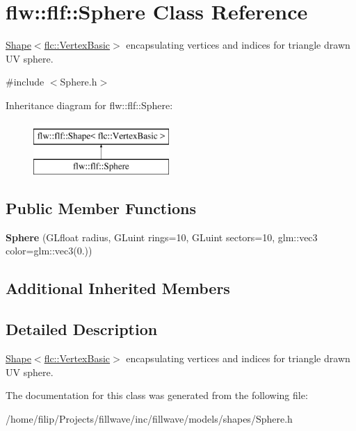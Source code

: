 \hypertarget{classflw_1_1flf_1_1Sphere}{}\section{flw\+:\+:flf\+:\+:Sphere Class Reference}
\label{classflw_1_1flf_1_1Sphere}


\hyperlink{classflw_1_1flf_1_1Shape}{Shape$<$flc\+::\+Vertex\+Basic$>$} encapsulating vertices and indices for triangle drawn UV sphere.  




{\ttfamily \#include $<$Sphere.\+h$>$}

Inheritance diagram for flw\+:\+:flf\+:\+:Sphere\+:\begin{figure}[H]
\begin{center}
\leavevmode
\includegraphics[height=2.000000cm]{classflw_1_1flf_1_1Sphere}
\end{center}
\end{figure}
\subsection*{Public Member Functions}
\begin{DoxyCompactItemize}
\item 
{\bfseries Sphere} (G\+Lfloat radius, G\+Luint rings=10, G\+Luint sectors=10, glm\+::vec3 color=glm\+::vec3(0.))\hypertarget{classflw_1_1flf_1_1Sphere_ac7c90f361a9b1aaf268c5372c8997fd6}{}\label{classflw_1_1flf_1_1Sphere_ac7c90f361a9b1aaf268c5372c8997fd6}

\end{DoxyCompactItemize}
\subsection*{Additional Inherited Members}


\subsection{Detailed Description}
\hyperlink{classflw_1_1flf_1_1Shape}{Shape$<$flc\+::\+Vertex\+Basic$>$} encapsulating vertices and indices for triangle drawn UV sphere. 

The documentation for this class was generated from the following file\+:\begin{DoxyCompactItemize}
\item 
/home/filip/\+Projects/fillwave/inc/fillwave/models/shapes/Sphere.\+h\end{DoxyCompactItemize}
